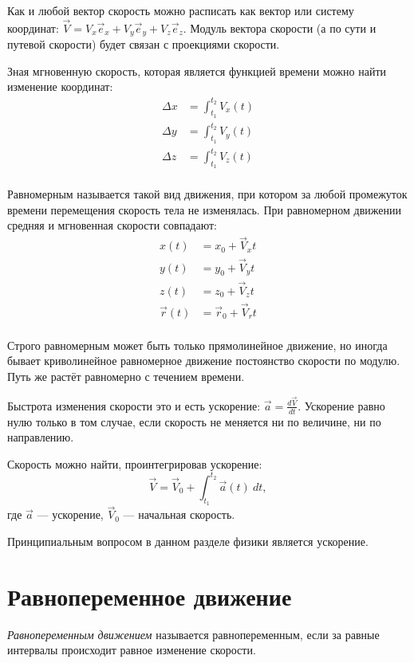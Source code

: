 \documentclass[10pt]{scrbook}
\begin{document}
Как и любой вектор скорость можно расписать как вектор или систему координат:
\( \vec{V} = V_x \vec{e}_x + V_y \vec{e}_y + V_z \vec{e}_z \). Модуль вектора
скорости (а по сути и путевой скорости) будет связан с проекциями скорости.

Зная мгновенную скорость, которая является функцией времени можно найти
изменение координат:
\begin{align*}
	\Delta x & = \int_{t_1}^{t_2} V_x(t) \\
	\Delta y & = \int_{t_1}^{t_2} V_y(t) \\
	\Delta z & = \int_{t_1}^{t_2} V_z(t) \\
\end{align*}

Равномерным называется такой вид движения, при котором за любой промежуток
времени перемещения скорость тела не изменялась. При равномерном движении
средняя и мгновенная скорости совпадают:
\begin{align*}
	x(t)       & = x_0 + \vec{V}_x t       \\
	y(t)       & = y_0 + \vec{V}_y t       \\
	z(t)       & = z_0 + \vec{V}_z t       \\
	\vec{r}(t) & = \vec{r}_0 + \vec{V}_r t \\
\end{align*}

Строго равномерным может быть только прямолинейное движение, но иногда бывает
криволинейное равномерное движение постоянство скорости по модулю. Путь же
растёт равномерно с течением времени.

Быстрота изменения скорости это и есть ускорение: \( \vec{a} = \frac{d
	\vec{V}}{d t} \). Ускорение равно нулю только в том случае, если скорость не
меняется ни по величине, ни по направлению.

Скорость можно найти, проинтегрировав ускорение:
\[
	\vec{V} = \vec{V}_0 + \int_{{t_1}}^{{t_2}} {\vec{a}(t)} \: d{t} {}
	,\] где \( \vec{a} \) --- ускорение, \( \vec{V}_0 \) --- начальная скорость.

Принципиальным вопросом в данном разделе  физики является ускорение.

\section{Равнопеременное движение}

\emph{Равнопеременным движением} называется равнопеременным, если за равные
интервалы происходит равное изменение скорости.
\end{document}
